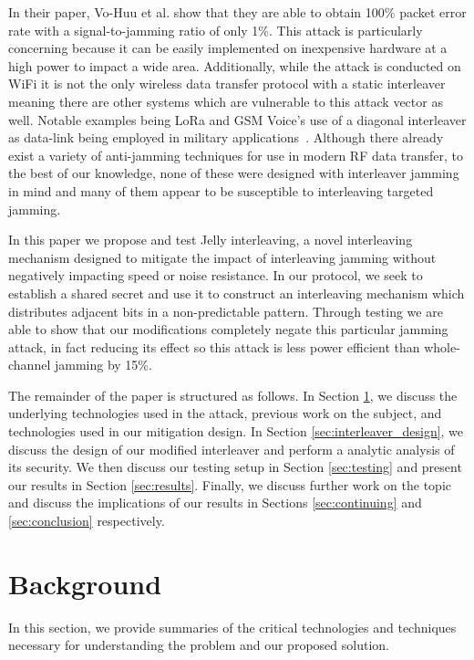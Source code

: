 \documentclass[sigconf]{acmart}
\begin{document}
In their paper, Vo-Huu et al. show that they are able to obtain 100\% packet error rate with a signal-to-jamming ratio of only 1\%. This attack is particularly concerning because it can be easily implemented on inexpensive hardware at a high power to impact a wide area. Additionally, while the attack is conducted on WiFi it is not the only wireless data transfer protocol with a static interleaver meaning there are other systems which are vulnerable to this attack vector as well. Notable examples being LoRa and GSM Voice's use of a diagonal interleaver as data-link being employed in military applications~\cite{knight2016decoding}. Although there already exist a variety of anti-jamming techniques for use in modern RF data transfer, to the best of our knowledge, none of these were designed with interleaver jamming in mind and many of them appear to be susceptible to interleaving targeted jamming. 

In this paper we propose and test Jelly interleaving, a novel interleaving mechanism designed to mitigate the impact of interleaving jamming without negatively impacting speed or noise resistance. In our protocol, we seek to establish a shared secret and use it to construct an interleaving mechanism which distributes adjacent bits in a non-predictable pattern. Through testing we are able to show that our modifications completely negate this particular jamming attack, in fact reducing its effect so this attack is less power efficient than whole-channel jamming by 15\%.

The remainder of the paper is structured as follows. In Section \ref{sec:background}, we discuss the underlying technologies used in the attack, previous work on the subject, and technologies used in our mitigation design. In Section \ref{sec:interleaver_design}, we discuss the design of our modified interleaver and perform a analytic analysis of its security. We then discuss our testing setup in Section \ref{sec:testing} and present our results in Section \ref{sec:results}. Finally, we discuss further work on the topic and discuss the implications of our results in Sections \ref{sec:continuing} and \ref{sec:conclusion} respectively. 

\section{Background}
\label{sec:background}

In this section, we provide summaries of the critical technologies and techniques necessary for understanding the problem and our proposed solution.
\end{document}
